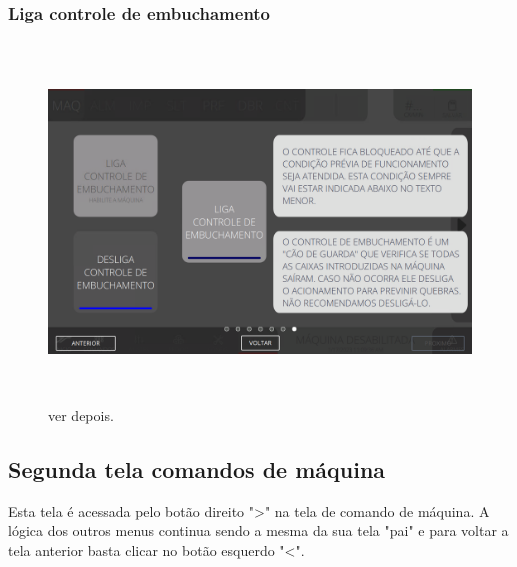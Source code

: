 \vspace*{\fill}

\newpage
\thispagestyle{fancy}

\vspace*{\fill}

\subsubsection{\small{Liga controle de embuchamento}}

\begin{figure}[h]
  \centering
  \includegraphics[width=576px,height=360px]{src/images/02-machine/e-7.png}
  \caption{ver depois.}
   \label{}
\end{figure}

\vspace*{\fill}

\newpage
\thispagestyle{fancy}

\vspace*{\fill}

\subsection{Segunda tela comandos de máquina}

Esta tela é acessada pelo botão direito "\textgreater" na tela de comando de máquina. A lógica dos outros menus continua sendo a mesma da sua tela "pai" e para voltar a tela anterior basta clicar no botão esquerdo "\textless{}".

\vspace{10pt}

